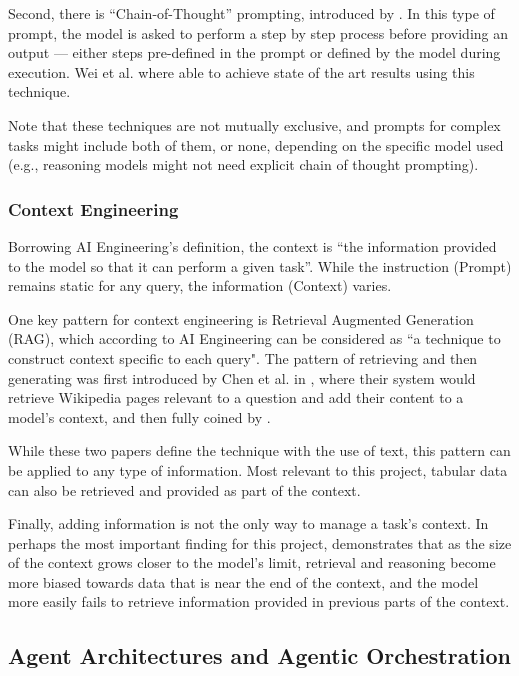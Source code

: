 \documentclass[a4paper]{report}
\begin{document}
Second, there is ``Chain-of-Thought'' prompting, introduced by \cite{wei2023chainofthoughtpromptingelicitsreasoning}. In this type of prompt, the model is asked to perform a step by step process before providing an output --- either steps pre-defined in the prompt or defined by the model during execution. Wei et al. where able to achieve state of the art results using this technique.

Note that these techniques are not mutually exclusive, and prompts for complex tasks might include both of them, or none, depending on the specific model used (e.g., reasoning models might not need explicit chain of thought prompting).

\subsubsection{Context Engineering}

Borrowing AI Engineering's definition, the context is ``the information provided to the model so that it can perform a given task''. While the instruction (Prompt) remains static for any query, the information (Context) varies.

One key pattern for context engineering is Retrieval Augmented Generation (RAG), which according to AI Engineering can be considered as ``a technique to construct context specific to each query". The pattern of retrieving and then generating was first introduced by Chen et al. in \cite{chen2017readingwikipediaansweropendomain}, where their system would retrieve Wikipedia pages relevant to a question and add their content to a model's context, and then fully coined by \cite{lewis2021retrievalaugmentedgeneration}.

While these two papers define the technique with the use of text, this pattern can be applied to any type of information. Most relevant to this project, tabular data can also be retrieved and provided as part of the context.

Finally, adding information is not the only way to manage a task's context. In perhaps the most important finding for this project, \cite{veseli2025positionalbiasesshiftinputs} demonstrates that as the size of the context grows closer to the model's limit, retrieval and reasoning become more biased towards data that is near the end of the context, and the model more easily fails to retrieve information provided in previous parts of the context.

\subsection{Agent Architectures and Agentic Orchestration}
\end{document}
